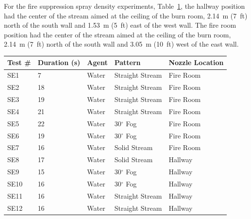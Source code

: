 \documentclass[12pt,oneside]{book}
\begin{document}
For the fire suppression spray density experiments, Table~\ref{tab:spray_density_tests2}, the hallway position had the center of the stream aimed at the ceiling of the burn room, 2.14~m (7~ft) north of the south wall and 1.53~m (5~ft) east of the west wall. The fire room position had the center of the stream aimed at the ceiling of the burn room, 2.14~m (7~ft) north of the south wall and 3.05~m (10~ft) west of the east wall.

\begin{table}[!ht]
\footnotesize
\centering
{}\label{tab:spray_density_tests2}
\begin{tabular}{lllll}
\toprule[1.5pt]
Test \#    & Duration (s)  & Agent  &  Pattern            & Nozzle Location  \\
\midrule
SE1        & 7             & Water  &  Straight Stream    &    Fire Room          \\
SE2        & 18            & Water  &  Straight Stream    &    Fire Room          \\
SE3        & 19            & Water  &  Straight Stream    &    Fire Room          \\
SE4        & 21            & Water  &  Straight Stream    &    Fire Room          \\
SE5        & 22            & Water  &  30$^{\circ}$ Fog   &    Fire Room          \\
SE6        & 19            & Water  &  30$^{\circ}$ Fog   &    Fire Room          \\
SE7        & 16            & Water  &  Solid Stream       &    Fire Room          \\
SE8        & 17            & Water  &  Solid Stream       &    Hallway            \\
SE9        & 15            & Water  &  30$^{\circ}$ Fog   &    Hallway            \\
SE10       & 16            & Water  &  30$^{\circ}$ Fog   &    Hallway            \\
SE11       & 16            & Water  &  Straight Stream    &    Hallway            \\
SE12       & 16            & Water  &  Straight Stream    &    Hallway            \\
\bottomrule[1.25pt]
\end{tabular}\par
\end{table}

\clearpage
\end{document}
